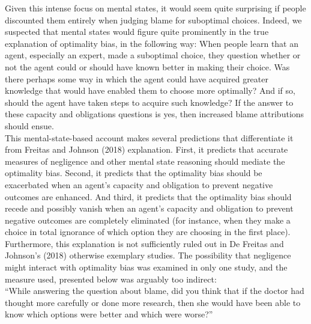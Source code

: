 \documentclass[
  man, donotrepeattitle,floatsintext]{apa6}
\begin{document}
Given this intense focus on mental states, it would seem quite surprising if people discounted them entirely when judging blame for suboptimal choices. Indeed, we suspected that mental states would figure quite prominently in the true explanation of optimality bias, in the following way: When people learn that an agent, especially an expert, made a suboptimal choice, they question whether or not the agent could or should have known better in making their choice. Was there perhaps some way in which the agent could have acquired greater knowledge that would have enabled them to choose more optimally? And if so, should the agent have taken steps to acquire such knowledge? If the answer to these capacity and obligations questions is yes, then increased blame attributions should ensue.\\
This mental-state-based account makes several predictions that differentiate it from Freitas and Johnson (2018) explanation. First, it predicts that accurate measures of negligence and other mental state reasoning should mediate the optimality bias. Second, it predicts that the optimality bias should be exacerbated when an agent's capacity and obligation to prevent negative outcomes are enhanced. And third, it predicts that the optimality bias should recede and possibly vanish when an agent's capacity and obligation to prevent negative outcomes are completely eliminated (for instance, when they make a choice in total ignorance of which option they are choosing in the first place).\\
Furthermore, this explanation is not sufficiently ruled out in De Freitas and Johnson's (2018) otherwise exemplary studies. The possibility that negligence might interact with optimality bias was examined in only one study, and the measure used, presented below was arguably too indirect:\\
``While answering the question about blame, did you think that if the doctor had thought more carefully or done more research, then she would have been able to know which options were better and which were worse?''\\
\end{document}
